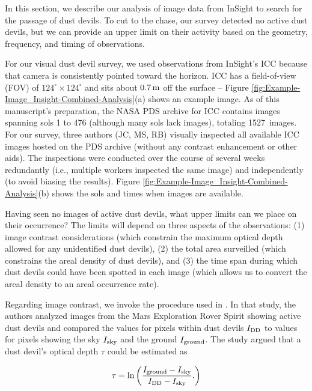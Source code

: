\documentclass{aastex63}
\newcommand{\numICCimages}{1527}
\begin{document}
In this section, we describe our analysis of image data from InSight to search for the passage of dust devils. To cut to the chase, our survey detected no active dust devils, but we can provide an upper limit on their activity based on the geometry, frequency, and timing of observations.

For our visual dust devil survey, we used observations from InSight's ICC because that camera is consistently pointed toward the horizon. ICC has a field-of-view (FOV) of $124^\circ\times124^\circ$ and sits about $0.7\,{\rm m}$ off the surface \citep{2018SSRv..214..105M} -- Figure \ref{fig:Example-Image_Insight-Combined-Analysis}(a) shows an example image. As of this manuscript's preparation, the NASA PDS archive for ICC contains images spanning sols 1 to 476 (although many sols lack images), totaling \numICCimages\ images. For our survey, three authors (JC, MS, RB) visually inspected all available ICC images hosted on the PDS archive (without any contrast enhancement or other aids). The inspections were conducted over the course of several weeks redundantly (i.e., multiple workers inspected the same image) and independently (to avoid biasing the results). Figure \ref{fig:Example-Image_Insight-Combined-Analysis}(b) shows the sols and times when images are available. 

Having seen no images of active dust devils, what upper limits can we place on their occurrence? The limits will depend on three aspects of the observations: (1) image contrast considerations (which constrain the maximum optical depth allowed for any unidentified dust devils), (2) the total area surveilled (which constrains the areal density of dust devils), and (3) the time span during which dust devils could have been spotted in each image (which allows us to convert the areal density to an areal occurrence rate).

Regarding image contrast, we invoke the procedure used in \citet{2006JGRE..11112S09G}. In that study, the authors analyzed images from the Mars Exploration Rover Spirit showing active dust devils and compared the values for pixels within dust devils $I_{\rm DD}$ to values for pixels showing the sky $I_{\rm sky}$ and the ground $I_{\rm ground}$. The study argued that a dust devil's optical depth $\tau$ could be estimated as

\begin{equation}
    \tau = \ln \left( \dfrac{I_{\rm ground} - I_{\rm sky}}{I_{\rm DD} - I_{\rm sky}}. \right)\label{eqn:optical_depth}
\end{equation}
\end{document}
